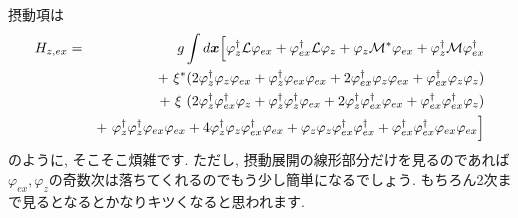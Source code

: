 \documentclass[10.5pt,a4paper]{jreport}
\newcommand{\calM}{{\cal M}}
\newcommand{\calL}{{\cal L}}
\begin{document}
摂動項は
\begin{eqnarray}
    \nonumber  H_{z, ex} &=& g\int d\bm{x} \Bigl[\varphi_z^\dagger\calL\varphi_{ex} + \varphi_{ex}^\dagger\calL\varphi_z + \varphi_z\calM^*\varphi_{ex} + \varphi_z^\dagger\calM\varphi_{ex}^\dagger\\
    \nonumber  && +\ \xi^*(2\varphi_z^\dagger\varphi_z\varphi_{ex} + \varphi_z^\dagger\varphi_{ex}\varphi_{ex} + 2\varphi_{ex}^\dagger\varphi_z\varphi_{ex} + \varphi_{ex}^\dagger\varphi_z\varphi_z)\\
    \nonumber  && +\ \xi\ (2\varphi_z^\dagger\varphi_{ex}^\dagger\varphi_z + \varphi_z^\dagger\varphi_z^\dagger\varphi_{ex} + 2\varphi_z^\dagger\varphi_{ex}^\dagger\varphi_{ex} + \varphi_{ex}^\dagger\varphi_{ex}^\dagger\varphi_z)\\
    && +\ \varphi^\dagger_z \varphi^\dagger_z \varphi_{ex}\varphi_{ex} + 4\varphi^\dagger_z \varphi_z \varphi^\dagger_{ex}\varphi_{ex} + \varphi_z \varphi_z \varphi^\dagger_{ex}\varphi^\dagger_{ex} + \varphi_{ex}^\dagger\varphi_{ex}^\dagger\varphi_{ex}\varphi_{ex}\Bigr]\label{ZeromodeHamiltonian}
\end{eqnarray}
のように, そこそこ煩雑です. ただし, 摂動展開の線形部分だけを見るのであれば$\varphi_{ex}, \varphi_z$の奇数次は落ちてくれるのでもう少し簡単になるでしょう. もちろん2次まで見るとなるとかなりキツくなると思われます.
\end{document}
